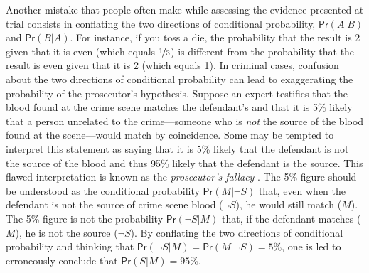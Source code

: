 \documentclass{article}
\newcommand{\pr}{\mathsf{Pr}}
\begin{document}
Another mistake that people often make while assessing the evidence presented at trial consists in conflating the two directions of conditional probability, $\pr(A\vert B)$ and $\pr(B \vert A)$. For instance, if you toss a die, the probability that the result is 2 given that it is even (which equals $\nicefrac{1}{3}$) is different from the probability that the result is even given that it is 2 (which equals 1). 
%
In criminal cases, confusion about the two directions of conditional probability can lead to exaggerating the probability of the prosecutor's hypothesis.   
Suppose an expert testifies that the blood found at the crime scene matches the defendant's and that it is 5\% likely that a person unrelated to the crime---someone who is \textit{not} the source of the blood found at the  scene---would match by coincidence. Some may be tempted to interpret this statement as saying that it is 5\% likely that the defendant is not the source of the blood and thus 95\% likely that the defendant is the source. This flawed interpretation  is known as the \textit{prosecutor's fallacy} \citep{thompson1987interpretation}.
% 
The 5\% figure should be understood as the conditional probability $\pr(M \vert \neg S)$ that, even when the defendant is not the source of crime scene blood ($\neg S$), he would still match ($M$). The 5\% figure is not the probability $\pr(\neg S \vert M)$ that, if the defendant matches ($M$), he is not the source ($\neg S$). %
By  conflating the two directions of conditional probability and thinking that $\pr(\neg S \vert M)=\pr(M \vert \neg S)=5\%$, one is led to erroneously  conclude that $\pr (S | M)=95\%$. 
\end{document}
